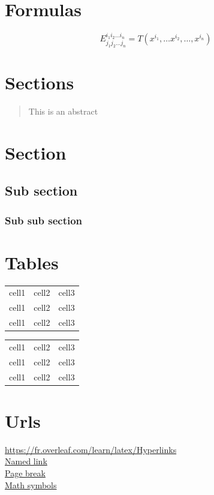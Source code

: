 \documentclass{article}
\begin{document}
\section{Formulas}
\[
  E^{i_1 i_2 \dots i_n}_{j_1 j_2 \dots j_n}
  = T(x^{i_1}, \dots x^{i_2}, \dots, x^{i_n})
\]

\section{Sections}
\begin{abstract}
  This is an abstract
\end{abstract}

\section{Section}
\subsection{Sub section}
\subsubsection{Sub sub section}

\section{Tables}
\begin{tabular}{ c c c }
  cell1 & cell2 & cell3 \\
  cell1 & cell2 & cell3 \\
  cell1 & cell2 & cell3 \\
\end{tabular}

\begin{tabular}{ | c | c | c | }
  \hline
  cell1 & cell2 & cell3 \\
  cell1 & cell2 & cell3 \\
  cell1 & cell2 & cell3 \\
  \hline
\end{tabular}

\section{Urls}
\url{https://fr.overleaf.com/learn/latex/Hyperlinks} \\
\href{https://fr.overleaf.com/learn/latex/Hyperlinks}{Named link} \\
\href{http://www.personal.ceu.hu/tex/breaking.htm}{Page break} \\
\href{https://fr.overleaf.com/learn/latex/List_of_Greek_letters_and_math_symbols}{Math symbols}
\end{document}
